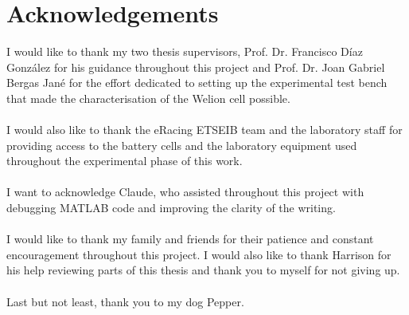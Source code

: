 \chapter*{Acknowledgements}

I would like to thank my two thesis supervisors, 
Prof. Dr. Francisco Díaz González for his guidance 
throughout this project and Prof. Dr. Joan Gabriel Bergas Jané for the effort dedicated to setting up the experimental 
test bench that made the characterisation of the Welion cell possible.
\\
\\
I would also like to thank the eRacing ETSEIB team and the laboratory staff for providing access to the 
battery cells and the laboratory equipment used 
throughout the experimental phase of this work.
\\
\\
I want to acknowledge Claude, who assisted throughout this project with 
debugging MATLAB code and improving the clarity of the writing.
\\
\\
I would like to thank my family and friends for their patience and 
constant encouragement throughout this project. I would also like to thank 
Harrison for his help reviewing parts of this thesis and thank you to myself for not giving up.
\\
\\
Last but not least, thank you to my dog Pepper.
